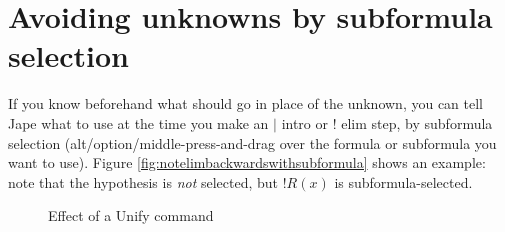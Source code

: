 \documentclass[11pt]{book}
\newcommand{\Figref}[1]{Figure \ref{fig:#1}}
\begin{document}
\section{Avoiding unknowns by subformula selection}

If you know beforehand what should go in place of the unknown, you can tell Jape what to use at the time you make an $|$ intro or $!$ elim step, by subformula selection (alt/option/middle-press-and-drag over the formula or subformula you want to use). \Figref{notelimbackwardswithsubformula} shows an example: note that the hypothesis is \emph{not} selected, but $!R(x)$ is subformula-selected.

\begin{figure}
\centering
{}
\qquad
{}
\caption{Effect of a Unify command}
\label{fig:unifyreplacesunknown}
\end{figure}
\end{document}
